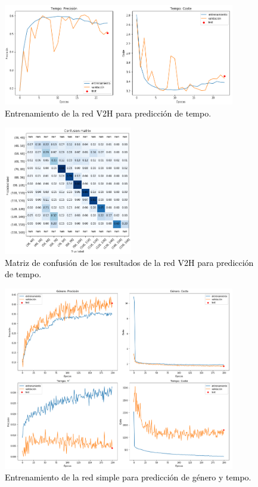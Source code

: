 \begin{figure}[!ht]
  \centering
  \includegraphics[width=0.9\textwidth]{Figures/entrenamiento_tempo_V2H.png}
  \caption{\textcolor{black}{Entrenamiento de la red V2H para predicción de tempo}.}
  \label{Fig:entrenamiento_tempo_V2H}
\end{figure}

\begin{figure}[!ht]
  \centering
  \includegraphics[width=0.5\textwidth]{Figures/confusion_tempo_V2H.png}
  \caption{\textcolor{black}{Matriz de confusión de los resultados de la red V2H para predicción de tempo}.}
  \label{Fig:confusion_tempo_V2H}
\end{figure}


\begin{figure}[!ht]
  \centering
  \includegraphics[width=0.9\textwidth]{Figures/entrenamiento_simple.png}
  \caption{\textcolor{black}{Entrenamiento de la red simple para predicción de género y tempo}.}
  \label{Fig:entrenamiento_simple}
\end{figure}

